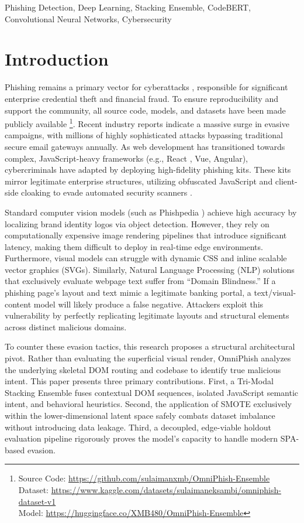 \documentclass[conference]{IEEEtran}
\begin{document}
\begin{IEEEkeywords}
Phishing Detection, Deep Learning, Stacking Ensemble, CodeBERT, Convolutional Neural Networks, Cybersecurity
\end{IEEEkeywords}

\section{Introduction}
Phishing remains a primary vector for cyberattacks \cite{apwg}, responsible for significant enterprise credential theft and financial fraud. To ensure reproducibility and support the community, all source code, models, and datasets have been made publicly available \footnote{\raggedright Source Code: \url{https://github.com/sulaimanxmb/OmniPhish-Ensemble} \\ Dataset: \url{https://www.kaggle.com/datasets/sulaimaneksambi/omniphish-dataset-v1} \\ Model: \url{https://huggingface.co/XMB480/OmniPhish-Ensemble}}. Recent industry reports indicate a massive surge in evasive campaigns, with millions of highly sophisticated attacks bypassing traditional secure email gateways annually. As web development has transitioned towards complex, JavaScript-heavy frameworks (e.g., React \cite{react}, Vue, Angular), cybercriminals have adapted by deploying high-fidelity phishing kits. These kits mirror legitimate enterprise structures, utilizing obfuscated JavaScript and client-side cloaking to evade automated security scanners \cite{oest, crawlphish}. 

Standard computer vision models (such as Phishpedia \cite{phishpedia}) achieve high accuracy by localizing brand identity logos via object detection. However, they rely on computationally expensive image rendering pipelines that introduce significant latency, making them difficult to deploy in real-time edge environments. Furthermore, visual models can struggle with dynamic CSS and inline scalable vector graphics (SVGs). Similarly, Natural Language Processing (NLP) solutions that exclusively evaluate webpage text suffer from ``Domain Blindness.'' If a phishing page's layout and text mimic a legitimate banking portal, a text/visual-content model will likely produce a false negative. Attackers exploit this vulnerability by perfectly replicating legitimate layouts and structural elements across distinct malicious domains.

To counter these evasion tactics, this research proposes a structural architectural pivot. Rather than evaluating the superficial visual render, OmniPhish analyzes the underlying skeletal DOM routing and codebase to identify true malicious intent. This paper presents three primary contributions. First, a Tri-Modal Stacking Ensemble fuses contextual DOM sequences, isolated JavaScript semantic intent, and behavioral heuristics. Second, the application of SMOTE exclusively within the lower-dimensional latent space safely combats dataset imbalance without introducing data leakage. Third, a decoupled, edge-viable holdout evaluation pipeline rigorously proves the model's capacity to handle modern SPA-based evasion.
\end{document}
